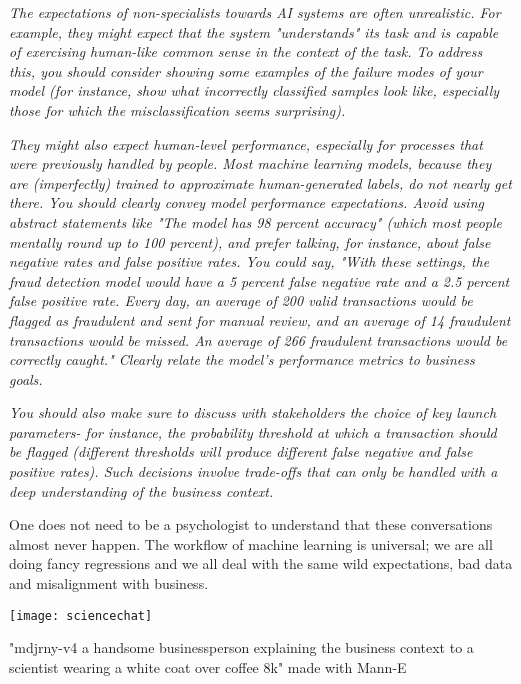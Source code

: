 \textit{The expectations of non-specialists towards AI systems are often unrealistic. For example, they might expect that the system "understands" its task and is capable of exercising human-like common sense in the context of the task. To address this, you should consider showing some examples of the failure modes of your model (for instance, show what incorrectly classified samples look like, especially those for which the misclassification seems surprising).} 

\textit{They might also expect human-level performance, especially for processes that were previously handled by people. Most machine learning models, because they are (imperfectly) trained to approximate human-generated labels, do not nearly get there. You should clearly convey model performance expectations. Avoid using abstract statements like "The model has 98 percent accuracy" (which most people mentally round up to 100 percent), and prefer talking, for instance, about false negative rates and false positive rates. You could say, "With these settings, the fraud detection model would have a 5 percent false negative rate and a 2.5 percent false positive rate. Every day, an average of 200 valid transactions would be flagged as fraudulent and sent for manual review, and an average of 14 fraudulent transactions would be missed. An average of 266 fraudulent transactions would be correctly caught." Clearly relate the model's performance metrics to business goals.}

\textit{You should also make sure to discuss with stakeholders the choice of key launch parameters- for instance, the probability threshold at which a transaction should be flagged (different thresholds will produce different false negative and false positive rates). Such decisions involve trade-offs that can only be handled with a deep understanding of the business context.}\cite{chollet2022} 

One does not need to be a psychologist to understand that these conversations almost never happen. The workflow of machine learning is universal; we are all doing fancy regressions and we all deal with the same wild expectations, bad data and misalignment with business.

\begin{pdf}
\begin{marginfigure}[-5.5cm]
        \texttt{[image: sciencechat]}
        \caption{"mdjrny-v4 a handsome businessperson explaining the business context to a scientist wearing a white coat over coffee 8k" made with Mann-E}
\end{marginfigure}
\end{pdf}

